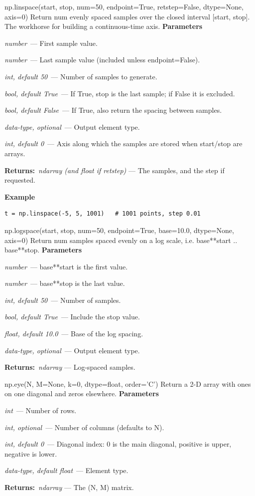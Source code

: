 \documentclass[10pt]{article}
\newenvironment{params}
  {\smallskip\textbf{\small\color{accent}Parameters}\par\nopagebreak
   \begin{description}[leftmargin=1.3em,itemsep=1.5pt,parsep=0pt,topsep=1pt,
      labelindent=0pt,style=sameline,font=\normalfont]}
  {\end{description}}
\newcommand{\pitem}[3]{\item[{\ttfamily\color{accent}#1}]{\itshape #2}\ --- #3}
\newcommand{\preturn}[2]{\smallskip\textbf{\small\color{accent}Returns:}\ {\itshape #1} --- #2\par}
\begin{document}
\begin{func}{np.linspace(start, stop, num=50, endpoint=True, retstep=False, dtype=None, axis=0)}
Return num evenly spaced samples over the closed interval [start, stop]. The workhorse for building a continuous-time axis.
\begin{params}
\pitem{start}{number}{First sample value.}
\pitem{stop}{number}{Last sample value (included unless endpoint=False).}
\pitem{num}{int, default 50}{Number of samples to generate.}
\pitem{endpoint}{bool, default True}{If True, stop is the last sample; if False it is excluded.}
\pitem{retstep}{bool, default False}{If True, also return the spacing between samples.}
\pitem{dtype}{data-type, optional}{Output element type.}
\pitem{axis}{int, default 0}{Axis along which the samples are stored when start/stop are arrays.}
\end{params}
\preturn{ndarray (and float if retstep)}{The samples, and the step if requested.}
\smallskip\textbf{\small\color{accent}Example}
\begin{lstlisting}[style=py]
t = np.linspace(-5, 5, 1001)   # 1001 points, step 0.01
\end{lstlisting}
\end{func}
\medskip

\begin{func}{np.logspace(start, stop, num=50, endpoint=True, base=10.0, dtype=None, axis=0)}
Return num samples spaced evenly on a log scale, i.e. base**start .. base**stop.
\begin{params}
\pitem{start}{number}{base**start is the first value.}
\pitem{stop}{number}{base**stop is the last value.}
\pitem{num}{int, default 50}{Number of samples.}
\pitem{endpoint}{bool, default True}{Include the stop value.}
\pitem{base}{float, default 10.0}{Base of the log spacing.}
\pitem{dtype}{data-type, optional}{Output element type.}
\end{params}
\preturn{ndarray}{Log-spaced samples.}
\end{func}
\medskip

\begin{func}{np.eye(N, M=None, k=0, dtype=float, order='C')}
Return a 2-D array with ones on one diagonal and zeros elsewhere.
\begin{params}
\pitem{N}{int}{Number of rows.}
\pitem{M}{int, optional}{Number of columns (defaults to N).}
\pitem{k}{int, default 0}{Diagonal index: 0 is the main diagonal, positive is upper, negative is lower.}
\pitem{dtype}{data-type, default float}{Element type.}
\end{params}
\preturn{ndarray}{The (N, M) matrix.}
\end{func}
\medskip
\end{document}

